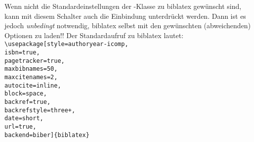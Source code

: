  Wenn nicht \dfalse die Standardeinstellungen der \HSKLbook-Klasse zu biblatex gewünscht sind, kann mit diesem Schalter auch die Einbindung unterdrückt werden. Dann ist es jedoch \emph{unbedingt} notwendig, biblatex selbst mit den gewünschten (abweichenden) Optionen zu laden!! Der Standardaufruf zu biblatex lautet:\\\verb!\usepackage[style=authoryear-icomp,!\\\verb!isbn=true,!\\\verb!pagetracker=true,!\\\verb!maxbibnames=50,!\\\verb!maxcitenames=2,!\\\verb!autocite=inline,!\\\verb!block=space,!\\\verb!backref=true,!\\\verb!backrefstyle=three+,!\\\verb!date=short,!\\\verb!url=true,!\\\verb!backend=biber]{biblatex}!
\fi%

